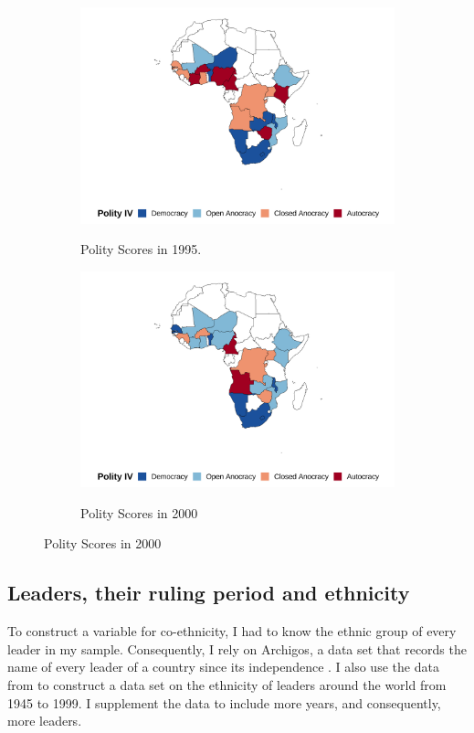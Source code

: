 \documentclass{wptemp}
\begin{document}
\begin{figure}[!htb]
\begin{subfigure}{.48\textwidth}
\label{fig1990}
\end{subfigure}
\begin{subfigure}{.48\textwidth}
\centering
\caption{Polity Scores in 1995.}
\includegraphics[width=.9\linewidth]{figure/1995.png}
\label{fig1995}
\end{subfigure}
\begin{subfigure}{.9\textwidth}
\centering
\caption{Polity Scores in 2000}
\includegraphics[width=.5\linewidth]{figure/2000.png}
\label{fig2000}
\end{subfigure}


\end{figure}

\subsection{Leaders, their ruling period and ethnicity}
To construct a variable for co-ethnicity, I had to know the ethnic group of every leader in my sample. Consequently, I rely on Archigos, a data set that records the name of every leader of a country since its independence \citep{goemans2006archigos}. I also use the data from \citet{fearon2007ethnic} to construct a data set on the ethnicity of leaders around the world from 1945 to 1999. I supplement \citet{fearon2007ethnic} the data to include more years, and consequently, more leaders.
\end{document}
